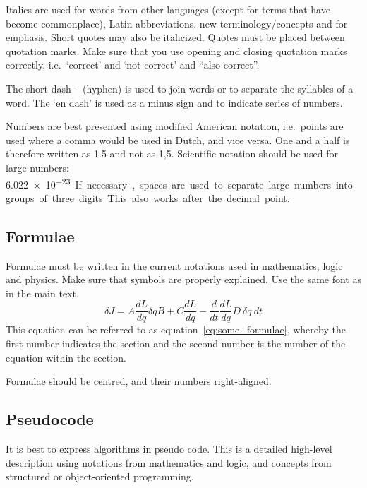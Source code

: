 Italics are used for words from other languages (except for terms that have become commonplace), Latin abbreviations, new terminology/concepts and for emphasis.
Short quotes may also be italicized.
Quotes must be placed between quotation marks.
Make sure that you use opening and closing quotation marks correctly, i.e.\ `correct' and `not correct' and ``also correct''.

The short dash - (hyphen) is used to join words or to separate the syllables of a word.
The `en dash' is used as a minus sign and to indicate series of numbers.

Numbers are best presented using modified American notation, i.e.\ points are used where a comma would be used in Dutch, and vice versa.
One and a half is therefore written as 1.5 and not as 1,5.
Scientific notation should be used for large numbers: \SI{6.022e-23}.
If necessary, spaces are used to separate large numbers into groups of three digits.
This also works after the decimal point.

\subsection{Formulae}\label{sec:_formulae}
Formulae must be written in the current notations used in mathematics, logic and physics.
Make sure that symbols are properly explained.
Use the same font as in the main text.
\begin{equation}\label{eq:some_formulae}
  \delta J =  A \frac{dL}{dq} \delta q B + C \frac{dL}{dq} - \frac{d}{dt}\frac{dL}{dq} D~\delta q ~dt
\end{equation}
This equation can be referred to as equation~\ref{eq:some_formulae}, whereby the first number indicates the section and the second number is the number of the equation within the section.

Formulae should be centred, and their numbers right-aligned.

\subsection{Pseudocode}\label{sec:_pseudocode}
It is best to express algorithms in pseudo code.
This is a detailed high-level description using notations from mathematics and logic, and concepts from structured or object-oriented programming.

